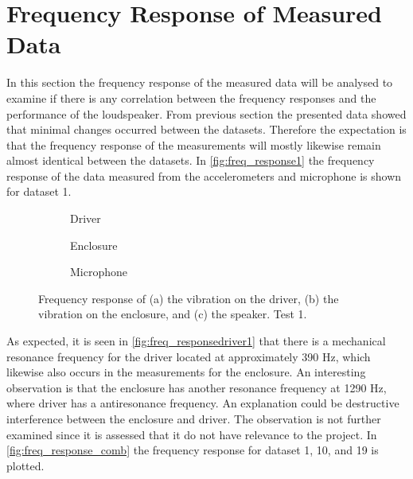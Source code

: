 \section{Frequency Response of Measured Data}

In this section the frequency response of the measured data will be analysed to examine if there is any correlation between the frequency responses and the performance of the loudspeaker. From previous section the presented data showed that minimal changes occurred between the datasets. Therefore the expectation is that the frequency response of the measurements will mostly likewise remain almost identical between the datasets. In \autoref{fig:freq_response1} the frequency response of the data measured from the accelerometers and microphone is shown for dataset 1.

\begin{figure}[H]
\centering
\begin{subfigure}[t]{0.37\textwidth}
	
	\caption{Driver}
	\label{fig:freq_responsedriver1}
\end{subfigure}
\begin{subfigure}[t]{0.28\textwidth}
	
	\caption{Enclosure}
	\label{fig:freq_responseenc1}
\end{subfigure}
\begin{subfigure}[t]{0.32\textwidth}
	
	\caption{Microphone}
	\label{fig:freq_responsemic1}
\end{subfigure}
\caption{Frequency response of (a) the vibration on the driver, (b) the vibration on the enclosure, and (c) the speaker. Test 1.}
\label{fig:freq_response1}
\end{figure}

As expected, it is seen in \autoref{fig:freq_responsedriver1} that there is a mechanical resonance frequency for the driver located at approximately 390 Hz, which likewise also occurs in the measurements for the enclosure. An interesting observation is that the enclosure has another resonance frequency at 1290 Hz, where driver has a antiresonance frequency. An explanation could be destructive interference between the enclosure and driver. The observation is not further examined since it is assessed that it do not have relevance to the project. In \autoref{fig:freq_response_comb} the frequency response for dataset 1, 10, and 19 is plotted.


